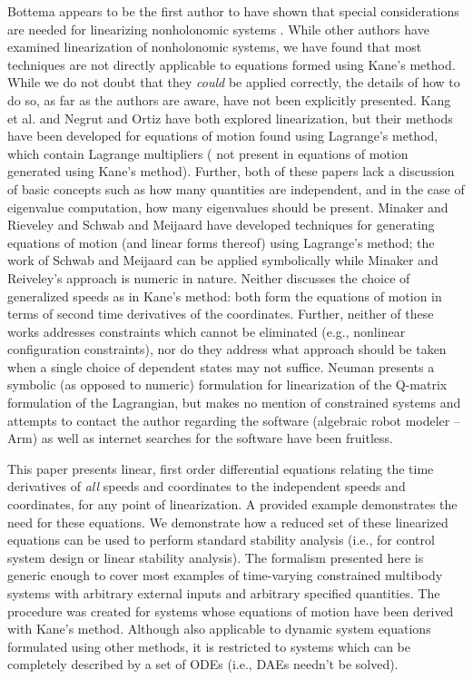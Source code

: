 \documentclass[smallcondensed,final]{svjour3}                     %
\begin{document}
Bottema appears to be the first author to have shown that special
considerations are needed for linearizing nonholonomic systems
\cite{Bottema1949}. While other authors have examined linearization of
nonholonomic systems, we have found that most techniques are not directly
applicable to equations formed using Kane's method. While we do not doubt that
they \textit{could} be applied correctly, the details of how to do so, as far
as the authors are aware, have not been explicitly presented. Kang et al.
\cite{Kang2003} and Negrut and Ortiz \cite{Negrut2006} have both explored
linearization, but their methods have been developed for equations of motion
found using Lagrange's method, which contain Lagrange multipliers ( not present
in equations of motion generated using Kane's method). Further, both of these
papers lack a discussion of basic concepts such as how many quantities are
independent, and in the case of eigenvalue computation, how many eigenvalues
should be present. Minaker and Rieveley \cite{Minaker2010} and Schwab and
Meijaard \cite{Schwab2003} have developed techniques for generating equations
of motion (and linear forms thereof) using Lagrange's method; the work of
Schwab and Meijaard can be applied symbolically while Minaker and Reiveley's
approach is numeric in nature. Neither discusses the choice of generalized
speeds as in Kane's method: both form the equations of motion in terms of
second time derivatives of the coordinates.  Further, neither of these works
addresses constraints which cannot be eliminated (e.g., nonlinear configuration
constraints), nor do they address what approach should be taken when a single
choice of dependent states may not suffice.  Neuman \cite{Neuman1984} presents
a symbolic (as opposed to numeric) formulation for linearization of the
Q-matrix formulation of the Lagrangian, but makes no mention of constrained
systems and attempts to contact the author regarding the software (algebraic
robot modeler -- Arm) as well as internet searches for the software have been
fruitless.


This paper presents linear, first order differential equations relating the
time derivatives of \textit{all} speeds and coordinates to the independent
speeds and coordinates, for any point of linearization.  A provided example
demonstrates the need for these equations.  We demonstrate how a reduced
set of these linearized equations can be used to perform standard stability
analysis (i.e., for control system design or linear stability analysis).  The
formalism presented here is generic enough to cover most examples of
time-varying constrained multibody systems with arbitrary external inputs and
arbitrary specified quantities.
The procedure was created for systems whose equations of motion have been
derived with Kane's method. Although also applicable to dynamic system
equations formulated using other methods, it is restricted to systems which can
be completely described by a set of ODEs (i.e., DAEs needn't be solved).
\end{document}
